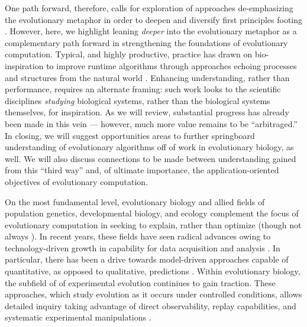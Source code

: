 One path forward, therefore, calls for exploration of approaches de-emphasizing the evolutionary metaphor in order to deepen and diversify first principles footing \citep{moore2023evolution}.
However, here, we highlight leaning \textit{deeper} into the evolutionary metaphor as a complementary path forward in strengthening the foundations of evolutionary computation.
Typical, and highly productive, practice has drawn on bio-inspiration to improve runtime algorithms through approaches echoing processes and structures from the natural world \citep{banzhaf2006artificial,kumar2003biologically}.
Enhancing understanding, rather than performance, requires an alternate framing: such work looks to the scientific disciplines \textit{studying} biological systems, rather than the biological systems themselves, for inspiration.
As we will review, substantial progress has already been made in this vein --- however, much more value remains to be ``arbitraged.''
In closing, we will suggest opportunities areas to further springboard understanding of evolutionary algorithms off of work in evolutionary biology, as well.
We will also discuss connections to be made between understanding gained from this ``third way'' and, of ultimate importance, the application-oriented objectives of evolutionary computation.

On the most fundamental level, evolutionary biology and allied fields of population genetics, developmental biology, and ecology complement the focus of evolutionary computation in seeking to explain, rather than optimize (though not always \citep{cobb2013directed,carroll2014applying}).
In recent years, these fields have seen radical advances owing to technology-driven growth in capability for data acquisition and analysis \citep{TODO}.
In particular, there has been a drive towards model-driven approaches capable of quantitative, as opposed to qualitative, predictions \citep{TODO}.
Within evolutionary biology, the subfield of of experimental evolution continiues to gain traction.
These approaches, which study evolution as it occurs under controlled conditions, allows detailed inquiry taking advantage of direct observability, replay capabilities, and systematic experimental manipulations \citep{kawecki2012experimental}.

